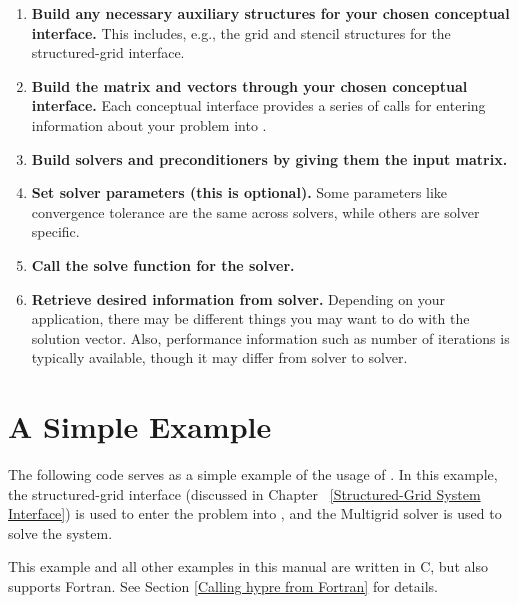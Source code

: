 \begin{enumerate}

\item
{\bf Build any necessary auxiliary structures for your chosen
conceptual interface.} This includes, e.g., the grid and stencil
structures for the structured-grid interface.

\item
{\bf Build the matrix and vectors through your chosen conceptual
interface.} Each conceptual interface provides a series of calls for
entering information about your problem into
\hypre{}.

\item
{\bf Build solvers and preconditioners by giving them the input
matrix.}

\item
{\bf Set solver parameters (this is optional).}  Some parameters like
convergence tolerance are the same across solvers, while others are
solver specific.

\item
{\bf Call the solve function for the solver.}

\item
{\bf Retrieve desired information from solver.} Depending on your
application, there may be different things you may want to do with the
solution vector. Also, performance information such as number of
iterations is typically available, though it may differ from solver to
solver.

\end{enumerate}


\section{A Simple Example}

The following code serves as a simple example of the usage of
\hypre{}.  In this example, the structured-grid interface
(discussed in Chapter ~\ref{Structured-Grid System Interface}) is used
to enter the problem into \hypre{}, and the  Multigrid
solver is used to solve the system.

This example and all other examples in this manual are written in C,
but \hypre{} also supports Fortran.  See Section
\ref{Calling hypre from Fortran} for details.

